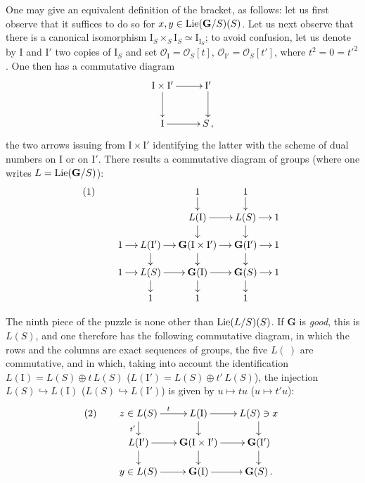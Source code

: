\label{II.4.7.3}
One may give an equivalent definition of the bracket, as follows: let us first
observe that it suffices to do so for \(x,y\in\operatorname{Lie}(\mathbf{G}/S)(S)\). Let us next
observe that there is a canonical isomorphism
\(\mathrm{I}_{S}\times_{S}\mathrm{I}_{S}\simeq\mathrm{I}_{\mathrm{I}_{S}}\); to avoid
confusion, let us denote by \(\mathrm{I}\) and \(\mathrm{I}'\) two copies of
\(\mathrm{I}_{S}\) and set \(\mathcal{O}_{\mathrm{I}}=\mathcal{O}_{S}[t]\),
\(\mathcal{O}_{\mathrm{I}'}=\mathcal{O}_{S}[t']\), where \(t^{2}=0=t'^{2}\).
One then has a commutative diagram
\[
\xymatrix{
\mathrm{I}\times\mathrm{I}' \ar[r] \ar[d] & \mathrm{I}' \ar[d] \\
\mathrm{I} \ar[r] & S\,,
}
\]
the two arrows issuing from \(\mathrm{I}\times\mathrm{I}'\) identifying the latter
with the scheme of dual numbers on \(\mathrm{I}\) or on \(\mathrm{I}'\). There
results a commutative diagram of groups (where one writes
\(L=\operatorname{Lie}(\mathbf{G}/S)\)):
\[
(1)\qquad
\xymatrix@C=1.15em@R=1.2em{
& & 1 \ar[d] & 1 \ar[d] & \\
& & L(\mathrm{I}) \ar[r] \ar[d] & L(S) \ar[r] \ar[d] & 1 \\
1 \ar[r] & L(\mathrm{I}') \ar[r] \ar[d]
  & \mathbf{G}(\mathrm{I}\times\mathrm{I}') \ar[r] \ar[d]
  & \mathbf{G}(\mathrm{I}') \ar[r] \ar[d] & 1 \\
1 \ar[r] & L(S) \ar[r] \ar[d]
  & \mathbf{G}(\mathrm{I}) \ar[r] \ar[d]
  & \mathbf{G}(S) \ar[r] \ar[d] & 1 \\
& 1 & 1 & 1 &
}
\]

The ninth piece of the puzzle is none other than \(\operatorname{Lie}(L/S)(S)\). If \(\mathbf{G}\)
is \emph{good}, this is \(L(S)\), and one therefore has the following commutative
diagram, in which the rows and the columns are exact sequences of groups, the five
\(L(\ )\) are commutative,%
{\renewcommand{\thefootnote}{(78)}}
and in which, taking into account the identification
\(L(\mathrm{I})=L(S)\oplus t\,L(S)\)
(\resp \(L(\mathrm{I}')=L(S)\oplus t'\,L(S)\)), the injection
\(L(S)\hookrightarrow L(\mathrm{I})\)
(\resp \(L(S)\hookrightarrow L(\mathrm{I}')\)) is given by \(u\mapsto tu\)
(\resp \(u\mapsto t'u\)):
\[
(2)\qquad
\xymatrix@C=1.6em@R=1.35em{
z\in L(S) \ar[r]^{t} \ar[d]_{t'}
  & L(\mathrm{I}) \ar[r] \ar[d]
  & L(S)\ni x \ar[d] \\
L(\mathrm{I}') \ar[r] \ar[d]
  & \mathbf{G}(\mathrm{I}\times\mathrm{I}') \ar[r] \ar[d]
  & \mathbf{G}(\mathrm{I}') \ar[d] \\
y\in L(S) \ar[r]
  & \mathbf{G}(\mathrm{I}) \ar[r]
  & \mathbf{G}(S)\,.
}
\]


